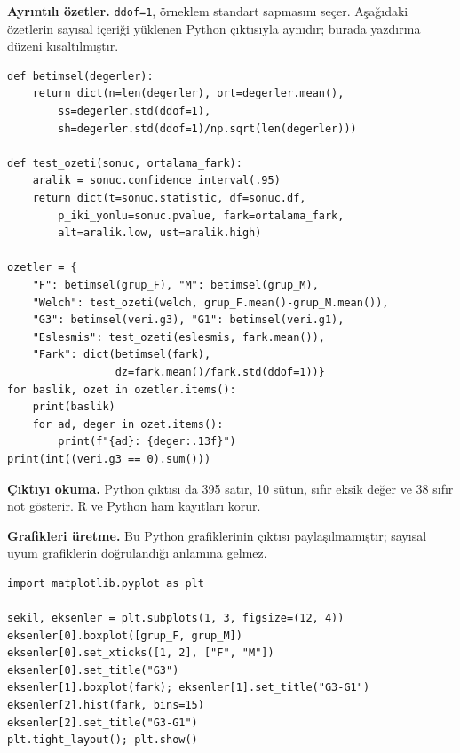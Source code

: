 \par\noindent\begin{minipage}{\linewidth}
\textbf{Ayrıntılı özetler.} \texttt{ddof=1}, örneklem standart sapmasını
seçer. Aşağıdaki özetlerin sayısal içeriği yüklenen Python çıktısıyla
aynıdır; burada yazdırma düzeni kısaltılmıştır.

\begin{lstlisting}[style=prismPythonApp]
def betimsel(degerler):
    return dict(n=len(degerler), ort=degerler.mean(),
        ss=degerler.std(ddof=1),
        sh=degerler.std(ddof=1)/np.sqrt(len(degerler)))

def test_ozeti(sonuc, ortalama_fark):
    aralik = sonuc.confidence_interval(.95)
    return dict(t=sonuc.statistic, df=sonuc.df,
        p_iki_yonlu=sonuc.pvalue, fark=ortalama_fark,
        alt=aralik.low, ust=aralik.high)

ozetler = {
    "F": betimsel(grup_F), "M": betimsel(grup_M),
    "Welch": test_ozeti(welch, grup_F.mean()-grup_M.mean()),
    "G3": betimsel(veri.g3), "G1": betimsel(veri.g1),
    "Eslesmis": test_ozeti(eslesmis, fark.mean()),
    "Fark": dict(betimsel(fark),
                 dz=fark.mean()/fark.std(ddof=1))}
for baslik, ozet in ozetler.items():
    print(baslik)
    for ad, deger in ozet.items():
        print(f"{ad}: {deger:.13f}")
print(int((veri.g3 == 0).sum()))
\end{lstlisting}

\textbf{Çıktıyı okuma.} Python çıktısı da 395 satır, 10 sütun, sıfır
eksik değer ve 38 sıfır not gösterir. R ve Python ham kayıtları korur.
\end{minipage}\par

\par\noindent\begin{minipage}{\linewidth}
\textbf{Grafikleri üretme.} Bu Python grafiklerinin çıktısı
paylaşılmamıştır; sayısal uyum grafiklerin doğrulandığı anlamına gelmez.

\begin{lstlisting}[style=prismPythonApp]
import matplotlib.pyplot as plt

sekil, eksenler = plt.subplots(1, 3, figsize=(12, 4))
eksenler[0].boxplot([grup_F, grup_M])
eksenler[0].set_xticks([1, 2], ["F", "M"])
eksenler[0].set_title("G3")
eksenler[1].boxplot(fark); eksenler[1].set_title("G3-G1")
eksenler[2].hist(fark, bins=15)
eksenler[2].set_title("G3-G1")
plt.tight_layout(); plt.show()
\end{lstlisting}

\end{minipage}\par

